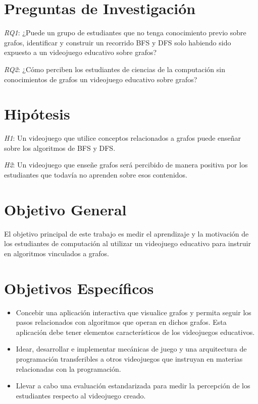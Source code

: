 \section{Preguntas de Investigación}
\label{RQ1}
\emph{RQ1}: ¿Puede un grupo de estudiantes que no tenga conocimiento previo sobre grafos, identificar y construir un recorrido BFS y DFS solo habiendo sido expuesto a un videojuego educativo sobre grafos?

\label{RQ2}
\emph{RQ2}: ¿Cómo perciben los estudiantes de ciencias de la computación sin conocimientos de grafos un videojuego educativo sobre grafos?


\section{Hipótesis}

\label{Hip1}
\emph{H1}: Un videojuego que utilice conceptos relacionados a grafos puede enseñar sobre los algoritmos de BFS y DFS.

\label{Hip2}
\emph{H2}: Un videojuego que enseñe grafos será percibido de manera positiva por los estudiantes que todavía no aprenden sobre esos contenidos.


\section{Objetivo General}

El objetivo principal de este trabajo es medir el aprendizaje y la motivación de los estudiantes de computación al utilizar un videojuego educativo para instruir en algoritmos vinculados a grafos.

\section{Objetivos Específicos}

\begin{itemize}

\item Concebir una aplicación interactiva que visualice grafos y permita seguir los pasos relacionados con algoritmos que operan en dichos grafos. Esta aplicación debe tener elementos característicos de los videojuegos educativos.

\item Idear, desarrollar e implementar mecánicas de juego y una arquitectura de programación transferibles a otros videojuegos que instruyan en materias relacionadas con la programación.

\item Llevar a cabo una evaluación estandarizada para medir la percepción de los estudiantes respecto al videojuego creado.

\end{itemize}

